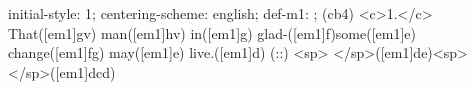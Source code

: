 initial-style: 1;
centering-scheme: english;
def-m1: \grealign;
(cb4) <c>1.</c> That([em1]gv) man([em1]hv) in([em1]g) glad-([em1]f)some([em1]e) change([em1]fg) may([em1]e) live.([em1]d) (::) <sp> </sp>([em1]de)<sp>   </sp>([em1]dcd)